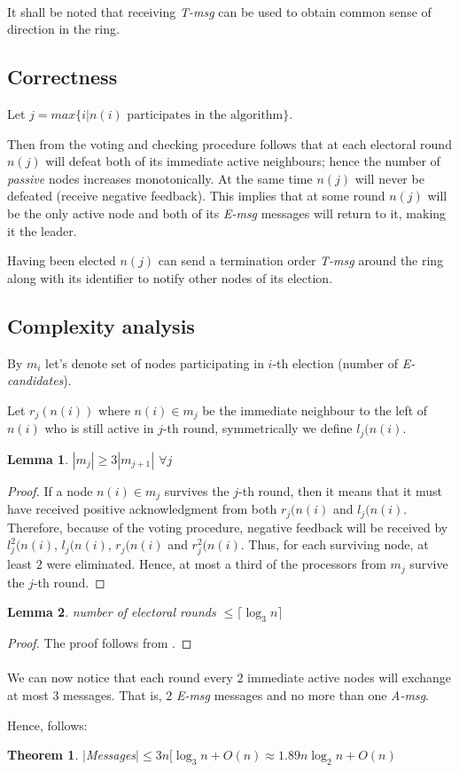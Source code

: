 \documentclass{article}
\newtheorem{lemma}{Lemma}
\newtheorem{theorem}{Theorem}
\begin{document}
\paragraph{}
It shall be noted that receiving \textit{T-msg} can be used to obtain common sense of direction in the ring.
\subsection*{Correctness}
Let $j=max\{i | n(i) \text{ participates in the algorithm}\}$. 

Then from the voting and checking procedure follows that at each electoral round $n(j)$ will defeat both of its immediate active neighbours; hence the number of \textit{passive} nodes increases monotonically. At the same time $n(j)$ will never be defeated (receive negative feedback). This implies that at some round $n(j)$ will be the only active node and both of its \textit{E-msg} messages will return to it, making it the leader.

Having been elected $n(j)$ can send a termination order \textit{T-msg} around the ring along with its identifier to notify other nodes of its election.
\subsection*{Complexity analysis}
By $m_i$ let's denote set of nodes participating in $i$-th election (number of \textit{E-candidates}).

Let $r_j(n(i))$ where $n(i)\in m_j$ be the immediate neighbour to the left of $n(i)$ who is still active in $j$-th round, symmetrically we define $l_j(n(i)$.
\begin{lemma}\label{lemma1}
    $|m_j|\geq 3|m_{j+1}|$ $\forall j$
\end{lemma}
\begin{proof}
If a node $n(i)\in m_j$ survives the $j$-th round, then it means that it must have received positive acknowledgment from both $r_j(n(i)$ and $l_j(n(i)$.
Therefore, because of the voting procedure, negative feedback will be received by $l^{2}_{j}(n(i)$, $l_{j}(n(i)$, $r_{j}(n(i)$ and $r^{2}_{j}(n(i)$. Thus, for each surviving node, at least $2$ were eliminated. 
Hence, at most a third of the processors from $m_j$ survive the $j$-th round.
\end{proof}
\begin{lemma}\label{lemma2}
    number of electoral rounds $\leq \lceil\log_{3}n\rceil$
\end{lemma}
\begin{proof}
The proof follows from .
\end{proof}
\paragraph{}
We can now notice that each round every $2$ immediate active nodes will exchange at most $3$ messages. That is, $2$ \textit{E-msg} messages and no more than one \textit{A-msg}.

Hence, follows:
\begin{theorem}
$|$Messages$|\leq 3n[\log_{3}n+O(n)\approx 1.89n \log_{2}n+O(n)$
\end{theorem}

 
\end{document}
